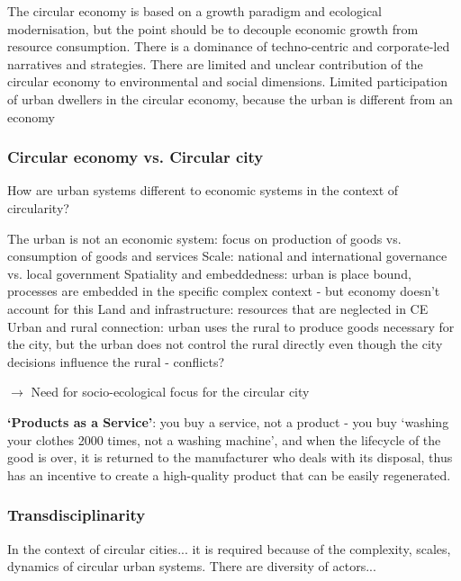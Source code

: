 \documentclass{article}
\begin{document}
\begin{outline}
	\1 The circular economy is based on a growth paradigm and ecological modernisation, but the point should be to decouple economic growth from resource consumption.
	\1 There is a dominance of techno-centric and corporate-led narratives and strategies.
	\1 There are limited and unclear contribution of the circular economy to environmental and social dimensions.
	\1 Limited participation of urban dwellers in the circular economy, because the urban is different from an economy
\end{outline}

\subsubsection{Circular economy vs. Circular city}

How are urban systems different to economic systems in the context of circularity?

\begin{outline}
	\1 The urban is not an economic system: focus on production of goods vs. consumption of goods and services
	\1 Scale: national and international governance vs. local government
	\1 Spatiality and embeddedness: urban is place bound, processes are embedded in the specific complex context - but economy doesn't account for this
	\1 Land and infrastructure: resources that are neglected in CE
	\1 Urban and rural connection: urban uses the rural to produce goods necessary for the city, but the urban does not control the rural directly even though the city decisions influence the rural - conflicts?
\end{outline}

$\rightarrow$ Need for socio-ecological focus for the circular city \parencite{williams2021circular}

\textbf{`Products as a Service'}: you buy a service, not a product - you buy `washing your clothes 2000 times, not a washing machine', and when the lifecycle of the good is over, it is returned to the manufacturer who deals with its disposal, thus has an incentive to create a high-quality product that can be easily regenerated.

\subsubsection{Transdisciplinarity}

In the context of circular cities... it is required because of the complexity, scales, dynamics of circular urban systems. There are diversity of actors...
\end{document}
